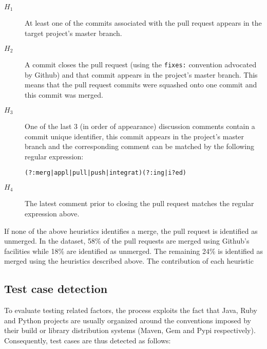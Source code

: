 \documentclass{sig-alternate}
\begin{document}
\begin{description}

  \item[$H_1$] At least one of the commits associated with the pull request appears in the target project's master branch.

  \item[$H_2$] A commit closes the pull request (using the \texttt{fixes:}
    convention advocated by Github) and that commit appears in the project's
    master branch.  This means that the pull request commits were squashed onto
    one commit and this commit was merged.

  \item[$H_3$] One of the last 3 (in order of appearance) discussion comments
    contain a commit unique identifier, this commit appears in the project's
    master branch and the corresponding comment can be matched by the following
    regular expression:

    \begin{small}
    \texttt{(?:merg|appl|pull|push|integrat)(?:ing|i?ed)}
    \end{small}

  \item[$H_4$] The latest comment prior to closing the pull request matches the
    regular expression above.

\end{description}

If none of the above heuristics identifies a merge, the pull request is
identified as unmerged. In the dataset, 58\% of the pull requests are 
merged using Github's facilities while 18\% are identified as unmerged.
The remaining 24\% is identified as merged using the heuristics described
above. The contribution of each heuristic 

\subsection{Test case detection}

To evaluate testing related factors, the process exploits the fact that Java,
Ruby and Python projects are usually organized around the conventions imposed by
their build or library distribution systems (Maven, Gem and Pypi respectively).
Consequently, test cases are thus detected as follows:
\end{document}
